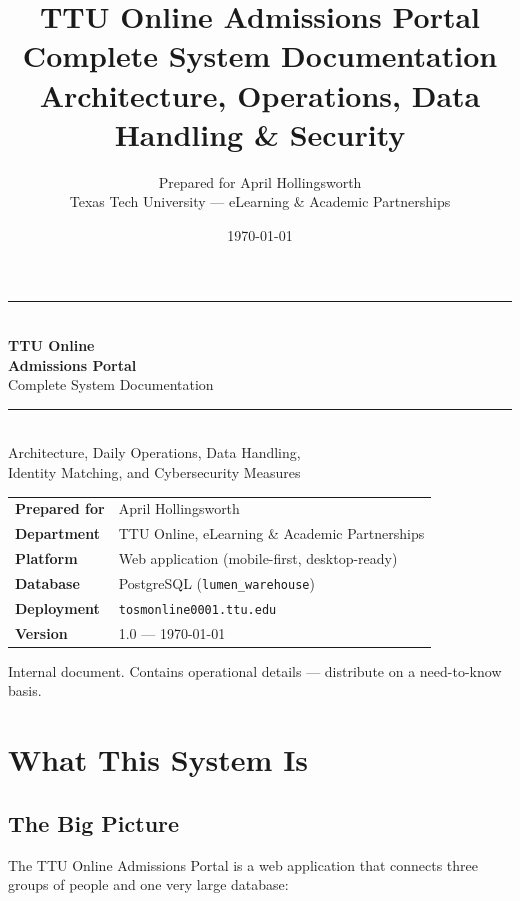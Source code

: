 \documentclass[11pt,letterpaper]{report}
\title{\Huge\bfseries TTU Online Admissions Portal\\[0.4em]
\Large Complete System Documentation\\[0.3em]
\normalsize Architecture, Operations, Data Handling \& Security}
\author{Prepared for April Hollingsworth\\Texas Tech University --- eLearning \& Academic Partnerships}
\date{\today}
\begin{document}
\begin{titlepage}
\centering
\vspace*{2cm}
{\color{ttured}\rule{\textwidth}{2pt}}\\[1.2em]
{\Huge\bfseries TTU Online\\[0.15em]Admissions Portal}\\[1em]
{\Large Complete System Documentation}\\[0.5em]
{\color{ttured}\rule{\textwidth}{2pt}}\\[2em]
{\large Architecture, Daily Operations, Data Handling,\\ Identity Matching, and Cybersecurity Measures}\\[2.5em]
\begin{tabular}{ll}
\textbf{Prepared for} & April Hollingsworth \\
\textbf{Department}   & TTU Online, eLearning \& Academic Partnerships \\
\textbf{Platform}     & Web application (mobile-first, desktop-ready) \\
\textbf{Database}     & PostgreSQL (\texttt{lumen\_warehouse}) \\
\textbf{Deployment}   & \texttt{tosmonline0001.ttu.edu} \\
\textbf{Version}      & 1.0 --- \today \\
\end{tabular}
\vfill
{\color{mute}\small Internal document. Contains operational details --- distribute on a need-to-know basis.}
\end{titlepage}

\tableofcontents
\newpage

\chapter{What This System Is}

\section{The Big Picture}

The TTU Online Admissions Portal is a web application that connects three groups
of people and one very large database:
\end{document}
